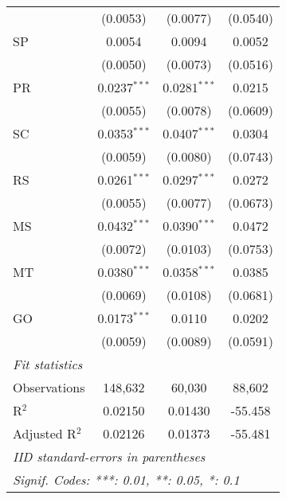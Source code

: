 \begin{tabular}{lccc}
                   & (0.0053)                & (0.0077)                & (0.0540)\\   
   SP              & 0.0054                  & 0.0094                  & 0.0052\\   
                   & (0.0050)                & (0.0073)                & (0.0516)\\   
   PR              & 0.0237$^{***}$          & 0.0281$^{***}$          & 0.0215\\   
                   & (0.0055)                & (0.0078)                & (0.0609)\\   
   SC              & 0.0353$^{***}$          & 0.0407$^{***}$          & 0.0304\\   
                   & (0.0059)                & (0.0080)                & (0.0743)\\   
   RS              & 0.0261$^{***}$          & 0.0297$^{***}$          & 0.0272\\   
                   & (0.0055)                & (0.0077)                & (0.0673)\\   
   MS              & 0.0432$^{***}$          & 0.0390$^{***}$          & 0.0472\\   
                   & (0.0072)                & (0.0103)                & (0.0753)\\   
   MT              & 0.0380$^{***}$          & 0.0358$^{***}$          & 0.0385\\   
                   & (0.0069)                & (0.0108)                & (0.0681)\\   
   GO              & 0.0173$^{***}$          & 0.0110                  & 0.0202\\   
                   & (0.0059)                & (0.0089)                & (0.0591)\\   
   \midrule
   \emph{Fit statistics}\\
   Observations    & 148,632                 & 60,030                  & 88,602\\  
   R$^2$           & 0.02150                 & 0.01430                 & -55.458\\  
   Adjusted R$^2$  & 0.02126                 & 0.01373                 & -55.481\\  
   \midrule \midrule
   \multicolumn{4}{l}{\emph{IID standard-errors in parentheses}}\\
   \multicolumn{4}{l}{\emph{Signif. Codes: ***: 0.01, **: 0.05, *: 0.1}}\\
\end{tabular}
\par\endgroup


